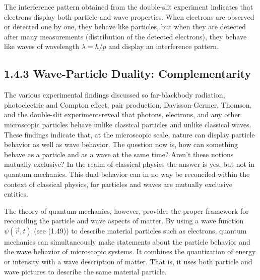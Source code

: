 \documentclass[10pt]{article}
\begin{document}
The interference pattern obtained from the double-slit experiment indicates that electrons display both particle and wave properties. When electrons are observed or detected one by one, they behave like particles, but when they are detected after many measurements (distribution of the detected electrons), they behave like waves of wavelength $\lambda=h / p$ and display an interference pattern.

\subsection*{1.4.3 Wave-Particle Duality: Complementarity}
The various experimental findings discussed so far-blackbody radiation, photoelectric and Compton effect, pair production, Davisson-Germer, Thomson, and the double-slit experimentsreveal that photons, electrons, and any other microscopic particles behave unlike classical particles and unlike classical waves. These findings indicate that, at the microscopic scale, nature can display particle behavior as well as wave behavior. The question now is, how can something behave as a particle and as a wave at the same time? Aren't these notions mutually exclusive? In the realm of classical physics the answer is yes, but not in quantum mechanics. This dual behavior can in no way be reconciled within the context of classical physics, for particles and waves are mutually exclusive entities.

The theory of quantum mechanics, however, provides the proper framework for reconciling the particle and wave aspects of matter. By using a wave function $\psi(\vec{r}, t)$ (see (1.49)) to describe material particles such as electrons, quantum mechanics can simultaneously make statements about the particle behavior and the wave behavior of microscopic systems. It combines the quantization of energy or intensity with a wave description of matter. That is, it uses both particle and wave pictures to describe the same material particle.
\end{document}

